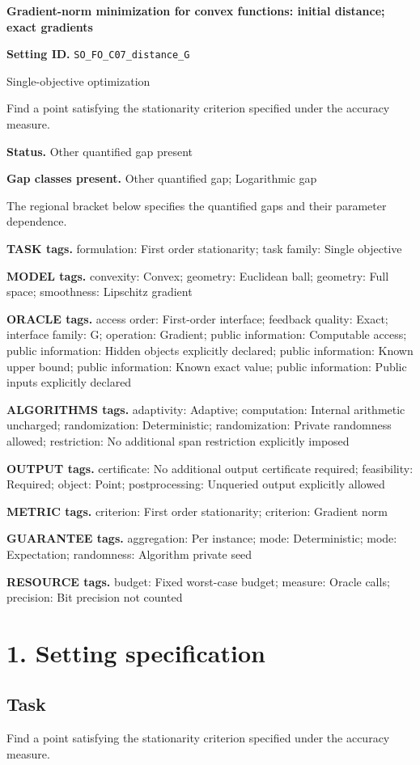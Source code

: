\documentclass[10pt,a4paper]{article}
\begin{document}
\raggedright

{\LARGE\bfseries\sffamily\color{AtlasNavy} Gradient-norm minimization for convex functions: initial distance; exact gradients\par}\vspace{5pt}
\textbf{Setting ID.} \texttt{SO\_\allowbreak{}FO\_\allowbreak{}C07\_\allowbreak{}distance\_\allowbreak{}G}

Single-objective optimization

Find a point satisfying the stationarity criterion specified under the accuracy measure.

\textbf{Status.} Other quantified gap present

\textbf{Gap classes present.} Other quantified gap; Logarithmic gap

The regional bracket below specifies the quantified gaps and their parameter dependence.

\textbf{TASK tags.} formulation: First order stationarity; task family: Single objective

\textbf{MODEL tags.} convexity: Convex; geometry: Euclidean ball; geometry: Full space; smoothness: Lipschitz gradient

\textbf{ORACLE tags.} access order: First-order interface; feedback quality: Exact; interface family: G; operation: Gradient; public information: Computable access; public information: Hidden objects explicitly declared; public information: Known upper bound; public information: Known exact value; public information: Public inputs explicitly declared

\textbf{ALGORITHMS tags.} adaptivity: Adaptive; computation: Internal arithmetic uncharged; randomization: Deterministic; randomization: Private randomness allowed; restriction: No additional span restriction explicitly imposed

\textbf{OUTPUT tags.} certificate: No additional output certificate required; feasibility: Required; object: Point; postprocessing: Unqueried output explicitly allowed

\textbf{METRIC tags.} criterion: First order stationarity; criterion: Gradient norm

\textbf{GUARANTEE tags.} aggregation: Per instance; mode: Deterministic; mode: Expectation; randomness: Algorithm private seed

\textbf{RESOURCE tags.} budget: Fixed worst-case budget; measure: Oracle calls; precision: Bit precision not counted

\section{1. Setting specification}
\subsection{Task}
Find a point satisfying the stationarity criterion specified under the accuracy measure.
\end{document}
